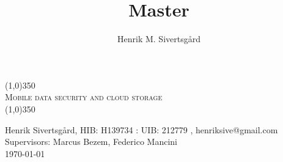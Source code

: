 \documentclass[11pt]{report}
\title{Master}
\author{Henrik M. Sivertsgård}
\begin{document}
  \begin{titlepage}
    \begin{center}
      \line(1,0){350}
      \\[1cm]
      \textsc{\LARGE Mobile data security and cloud storage}
      \\[1cm]
      \line(1,0){350}
    \end{center}
    Henrik Sivertsgård, HIB: H139734 : UIB: 212779 , henriksive@gmail.com
    \\[0.2cm]
    Supervisors: Marcus Bezem, Federico Mancini
    \\[0.2cm]
    \today
  \end{titlepage}

  \newpage
  \tableofcontents

  \listoffigures

  \listoftables

  \lstlistoflistings




  
  
  
  
  
  
  

  


  \printbibliography
\end{document}
